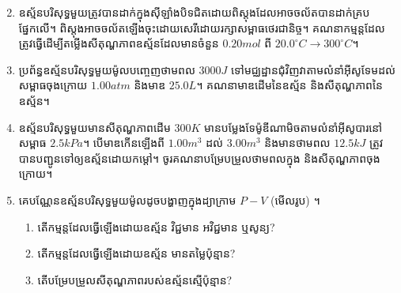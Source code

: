 \begin{enumerate}[m]
\begin{multicols}{2}
\begin{figure}[H]
		\end{figure}
	\end{multicols}
	\item ឧស្ម័នបរិសុទ្ធមួយត្រូវបានដាក់ក្នុងសុីឡាំងបិទជិតដោយពិស្តុងដែលអាចចល័តបានដាក់គ្របផ្នែកលើ។ ពិស្តុងអាចចល័តឡើងចុះដោយសេរីដោយរក្សាសម្ពាធថេរជានិច្ច។ គណនាកម្មន្តដែលត្រូវធ្វើដើម្បីតម្លើងសីតុណ្ហភាពឧស្ម័នដែលមានចំនួន $0.20mol$ ពី $20.0^\circ C\rightarrow 300^\circ C$។
	\item ប្រព័ន្ធឧស្ម័នបរិសុទ្ធមួយម៉ូលបញ្ចេញថាមពល $3000J$ ទៅមជ្ឈដ្ឋានជុំវិញវាតាមលំនាំអុីសូទែមដល់សម្ពាធចុងក្រោយ $1.00atm$ និងមាឌ $25.0L$។ គណនាមាឌដើមនៃឧស្ម័ន និងសីតុណ្ហភាពនៃឧស្ម័ន។
	\item ឧស្ម័នបរិសុទ្ធមួយមានសីតុណ្ហភាពដើម $300K$ មានបម្លែងទែម៉ូឌីណាមិចតាមលំនាំអុីសូបារនៅសម្ពាធ $2.5kPa$។ បើមាឌកើនឡើងពី $1.00m^{3}$ ដល់ $3.00m^{3}$ និងមានថាមពល $12.5kJ$ ត្រូវបានបញ្ជូនទៅឲ្យឧស្ម័នដោយកម្តៅ។ ចូរគណនាបម្រែបម្រួលថាមពលក្នុង និងសីតុណ្ហភាពចុងក្រោយ។
	\item គេបណ្ណែនឧស្ម័នបរិសុទ្ធមួយម៉ូលដូចបង្ហាញក្នុងដ្យាក្រាម $P-V$ (មើលរូប) ។
		\begin{enumerate}
			\item តើកម្មន្តដែលធ្វើឡើងដោយឧស្ម័ន វិជ្ជមាន​ អវិជ្ជមាន ឬសូន្យ?
			\item តើកម្មន្តដែលធ្វើឡើងដោយឧស្ម័ន មានតម្លៃប៉ុន្មាន?
			\item តើបម្រែបម្រួលសីតុណ្ហភាពរបស់ឧស្ម័នស្មើប៉ុន្មាន?

\end{enumerate}
\end{enumerate}
